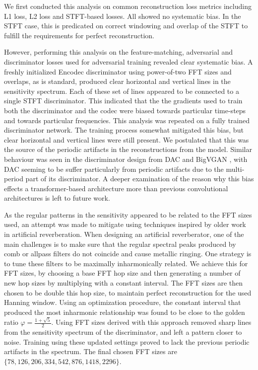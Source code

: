 \documentclass{article} %
\begin{document}
We first conducted this analysis on common reconstruction loss metrics including L1 loss, L2 loss and STFT-based losses. All showed no systematic bias. In the STFT case, this is predicated on correct windowing and overlap of the STFT to fulfill the requirements for perfect reconstruction. 

However, performing this analysis on the feature-matching, adversarial and discriminator losses used for adversarial training revealed clear systematic bias. A freshly initialized Encodec discriminator using power-of-two FFT sizes and overlaps, as is standard, produced clear horizontal and vertical lines in the sensitivity spectrum. Each of these set of lines appeared to be connected to a single STFT discriminator. This indicated that the the gradients used to train both the discriminator and the codec were biased towards particular time-steps and towards particular frequencies. This analysis was repeated on a fully trained discriminator network. The training process somewhat mitigated this bias, but clear horizontal and vertical lines were still present. We postulated that this was the source of the periodic artifacts in the reconstructions from the model. Similar behaviour was seen in the discriminator design from DAC \citep{kumar2023highfidelity} and BigVGAN \citep{bigvgan}, with DAC seeming to be suffer particularly from periodic artifacts due to the multi-period part of its discriminator. A deeper examination of the reason why this bias effects a transformer-based architecture more than previous convolutional architectures is left to future work.

As the regular patterns in the sensitivity appeared to be related to the FFT sizes used, an attempt was made to mitigate using techniques inspired by older work in artificial reverberation. When designing an artificial reverberator, one of the main challenges is to make sure that the regular spectral peaks produced by comb or allpass filters do not coincide and cause metallic ringing. One strategy is to tune these filters to be maximally inharmonically related. We achieve this for FFT sizes, by choosing a base FFT hop size and then generating a number of new hop sizes by multiplying with a constant interval. The FFT sizes are then chosen to be double this hop size, to maintain perfect reconstruction for the used Hanning window. Using an optimization procedure, the constant interval that produced the most inharmonic relationship was found to be close to the golden ratio $\varphi = \frac{1 + \sqrt{5}}{2}$. Using FFT sizes derived with this approach removed sharp lines from the sensitivity spectrum of the discriminator, and left a pattern closer to noise. Training using these updated settings proved to lack the previous periodic artifacts in the spectrum. The final chosen FFT sizes are $\{78, 126, 206, 334, 542, 876, 1418, 2296\}$.
\end{document}
